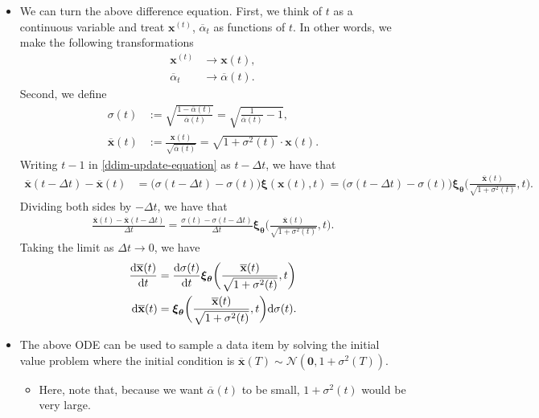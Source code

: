 \documentclass[10pt]{article}
\newcommand{\dee}{\mathrm{d}}
\newcommand{\ve}[1]{\mathbf{#1}}
\newcommand{\ves}[1]{\boldsymbol{#1}}
\newcommand{\mcal}[1]{\mathcal{#1}}
\begin{document}
\begin{itemize}
  \item We can turn the above difference equation. First, we think of $t$ as a continuous variable and treat $\ve{x}^{(t)}$, $\overline{\alpha}_t$ as functions of $t$. In other words, we make the following transformations
  \begin{align*}
    \ve{x}^{(t)} &\rightarrow \ve{x}(t),\\
    \overline{\alpha}_t &\rightarrow \overline{\alpha}(t).
  \end{align*}
  Second, we define
  \begin{align*}
    \sigma(t) &:= \sqrt{\frac{1 - \overline{\alpha}(t)}{\overline{\alpha}(t)}} = \sqrt{\frac{1}{\overline{\alpha}(t)} - 1}, \\
    \overline{\ve{x}}(t)
    &:= \frac{\ve{x}(t)}{\sqrt{\overline{\alpha}(t)}} = \sqrt{1 + \sigma^2(t)} \cdot \ve{x}(t).    
  \end{align*}
  Writing $t-1$ in \eqref{ddim-update-equation} as $t - \Delta t$, we have that
  \begin{align*}
    \overline{\ve{x}}(t - \Delta t) - \overline{\ve{x}}(t)
    &= \big( \sigma(t - \Delta t) - \sigma(t) \big) \ves{\xi}(\ve{x}(t), t)
    = \big( \sigma(t - \Delta t) - \sigma(t) \big) \ves{\xi}_{\ves{\theta}}\bigg(\frac{\overline{\ve{x}}(t)}{\sqrt{1 + \sigma^2(t)}}, t\bigg).
  \end{align*}
  Dividing both sides by $-\Delta t$, we have that
  \begin{align*}
    \frac{\overline{\ve{x}}(t) - \overline{\ve{x}}(t - \Delta t)}{\Delta t}
    = \frac{\sigma(t) - \sigma(t - \Delta t)}{\Delta t} \ves{\xi}_{\ves{\theta}}\bigg( \frac{\overline{\ve{x}}(t)}{\sqrt{1 + \sigma^2(t)}}, t \bigg).
  \end{align*}
  Taking the limit as $\Delta t \rightarrow 0$, we have
  \begin{align}
    \frac{\dee \overline{\ve{x}}(t)}{\dee t}
    &= \frac{\dee \sigma(t)}{\dee t} \ves{\xi}_{\ves{\theta}}\bigg( \frac{\overline{\ve{x}}(t)}{\sqrt{1 + \sigma^2(t)}}, t \bigg) \notag \\
    \dee \overline{\ve{x}}(t) &= \ves{\xi}_{\ves{\theta}}\bigg( \frac{\overline{\ve{x}}(t)}{\sqrt{1 + \sigma^2(t)}}, t \bigg) \dee \sigma(t). \label{ddim-ode}
  \end{align}

  \item The above ODE can be used to sample a data item by solving the initial value problem where the initial condition is $\overline{\ve{x}}(T) \sim \mcal{N}(\ve{0}, 1 + \sigma^2(T))$.
  \begin{itemize}
    \item Here, note that, because we want $\overline{\alpha}(t)$ to be small, $1 + \sigma^2(t)$ would be very large.
  \end{itemize}


\end{itemize}
\end{document}
